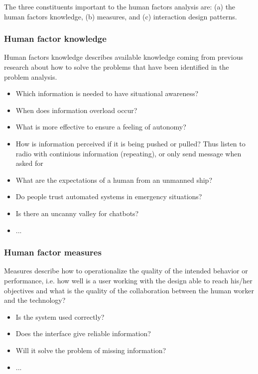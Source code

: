The three constituents important to the human factors analysis are: (a) the human factors knowledge, (b) measures, and (c) interaction design patterns.

\subsubsection{Human factor knowledge}
Human factors knowledge describes available knowledge coming from previous research about how to solve the problems that have been identified in the problem analysis.
\begin{itemize}
	\item Which information is needed to have situational awareness? \cite{HFW2002} \cite{Breda1999} \cite{Prison2013} \cite{Hodgetts2015} \cite{Porathe2014}
	\item When does information overload occur? \cite{Arimura2001} \cite{Neerincx2008} \cite{Schutter2016} \cite{Porathe2014}
	\item What is more effective to ensure a feeling of autonomy? \cite{Feys2016}
	\item How is information perceived if it is being pushed or pulled? Thus listen to radio with continious information (repeating), or only send message when asked for
	\item What are the expectations of a human from an unmanned ship?
	\item Do people trust automated systems in emergency situations? \cite{Neerincx2008} \cite{Walliser2011}
	\item Is there an uncanny valley for chatbots?
	\item ...
\end{itemize}

\subsubsection{Human factor measures}
Measures describe how to operationalize the quality of the intended behavior or performance, i.e. how well is a user working with the design able to reach his/her objectives and what is the quality of the collaboration between the human worker and the technology?
\begin{itemize}
	\item Is the system used correctly?
	\item Does the interface give reliable information?
	\item Will it solve the problem of missing information?
	\item ...
\end{itemize}

